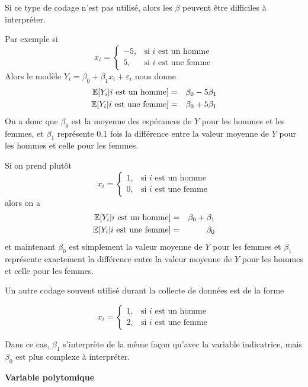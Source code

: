 Si ce type de codage n'est pas utilisé, alors les $\beta$ peuvent \^etre difficiles à
interpréter.

Par exemple si
$$x_{i}=\left\{\begin{array}{ll}-5, & \mbox{si $i$ est un homme}\\
5, & \mbox{si $i$ est une femme}\end{array}\right.$$
Alors le modèle $Y_i=\beta_0+\beta_1 x_i+\varepsilon_i$ nous donne
\begin{eqnarray*}
\mathbb{E}[Y_i|\mbox{$i$ est un homme}]&=&\beta_0-5\beta_1\\
\mathbb{E}[Y_i|\mbox{$i$ est une femme}]&=&\beta_0+5\beta_1
\end{eqnarray*}
On a donc que $\beta_0$ est la moyenne des espérances de $Y$ pour les hommes et les femmes, et $\beta_1$ représente 0.1 fois la différence entre la valeur moyenne de $Y$ pour les hommes et celle pour les femmes.

Si on prend plutôt
$$x_{i}=\left\{\begin{array}{ll}1, & \mbox{si $i$ est un homme}\\
0, & \mbox{si $i$ est une femme}\end{array}\right.$$ alors on a
\begin{eqnarray*}
\mathbb{E}[Y_i|\mbox{$i$ est un homme}]&=&\beta_0+\beta_1\\
\mathbb{E}[Y_i|\mbox{$i$ est une femme}]&=&\beta_0
\end{eqnarray*}
et maintenant $\beta_0$ est simplement la valeur moyenne de $Y$ pour les femmes et  $\beta_1$ représente exactement la différence entre la valeur moyenne de $Y$ pour les hommes et celle pour les femmes.

Un autre codage souvent utilisé durant la collecte de données est de la forme

$$x_{i}=\left\{\begin{array}{ll}1, & \mbox{si $i$ est un homme}\\
2, & \mbox{si $i$ est une femme}\end{array}\right.$$

Dans ce cas, $\beta_1$ s'interprète de la même façon qu'avec la variable indicatrice, mais $\beta_0$ est plus complexe à interpréter.

\textbf{Variable polytomique}

